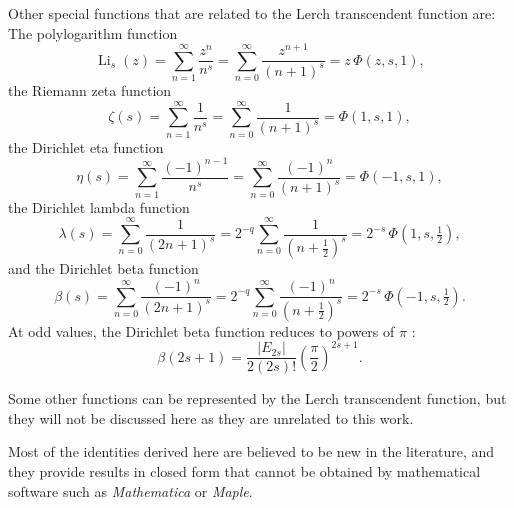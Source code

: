 \documentclass[11pt,reqno]{article}
\begin{document}
Other special functions that are related to the Lerch transcendent function are:\\
The polylogarithm function
\[\operatorname{Li}_s(z) = \sum_{n=1}^\infty \frac{z^n}{n^s}=\sum_{n=0}^\infty \frac{z^{n+1}}{{(n+1)}^s} = z \, \Phi(z, s, 1),\]
the Riemann zeta function
\[\zeta(s) = \sum_{n=1}^\infty \frac{1}{n^s} =\sum_{n=0}^\infty \frac{1}{{(n+1)}^s}= \Phi(1, s, 1),\]
the Dirichlet eta function
\[\eta(s) = \sum_{n=1}^\infty \frac{{(-1)}^{n-1}}{n^s} = \sum_{n=0}^\infty \frac{{(-1)}^{n}}{{(n+1)}^s} = \Phi(-1, s, 1),\]
the Dirichlet lambda function
\[\lambda(s) = \sum_{n=0}^\infty \frac{1}{{(2n+1)}^s}=2^{-q}\sum_{n=0}^\infty \frac{1}{{(n+\frac12)}^s}= 2^{-s} \, \Phi(1, s, \tfrac{1}{2}),\]
and the Dirichlet beta function
\[\beta(s) = \sum_{n=0}^\infty \frac{{(-1)}^{n}}{{(2n+1)}^s}=2^{-q}\sum_{n=0}^\infty \frac{{(-1)}^{n}}{{(n+\frac12)}^s} = 2^{-s} \, \Phi(-1, s, \tfrac{1}{2}).\]
At odd values, the Dirichlet beta function reduces to powers of $\pi$ \cite[p.32]{ali}:
\[\beta(2s+1)=\frac{|E_{2s}|}{2(2s)!}\left(\frac{\pi}{2}\right)^{2s+1}.\]

Some other functions can be represented by the Lerch transcendent function, but they will not be discussed here as  they are unrelated to this work.

Most of the identities derived here are believed to be new in the literature, and they provide results in closed form that cannot be obtained by mathematical software such as \textit{Mathematica} or \textit{Maple}.

\end{document}
